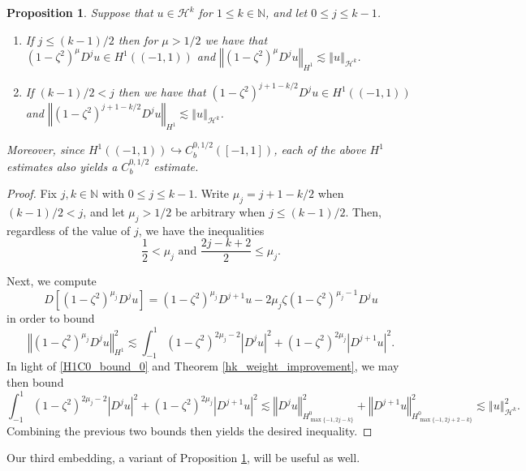\documentclass[11pt,reqno]{amsart}
\numberwithin{equation}{section}
\providecommand{\abs}[1]{\left\vert#1\right\vert}
\providecommand{\norm}[1]{\left\Vert#1\right\Vert}
\def\hal{\frac{1}{2}}
\def\ls{\lesssim}
\providecommand{\abs}[1]{\left\vert#1\right\vert}
\providecommand{\norm}[1]{\left\Vert#1\right\Vert}
\def\hal{\frac{1}{2}}
\def\ls{\lesssim}
\def\h{\mathcal{H}}
\def\N{\mathbb{N}}
\newtheorem{prop}[lem]{Proposition}
\begin{document}
\begin{prop}\label{H1C0_bound}
Suppose that $u \in \h^k$ for $1 \le k \in \N$, and let $0 \le j \le k-1$.
\begin{enumerate}
 \item If $j \le (k-1)/2$ then for $\mu >1/2$ we have that  $(1-\zeta^2)^\mu D^j u \in H^1((-1,1))$ and $\norm{(1-\zeta^2)^\mu D^j u }_{H^1} \ls \norm{u}_{\h^k}$.
 \item If $(k-1)/2 < j$ then we have that  $(1-\zeta^2)^{j+1-k/2} D^j u \in H^1((-1,1))$ and $\norm{(1-\zeta^2)^{j+1-k/2} D^j u }_{H^1} \ls \norm{u}_{\h^k}$. 
\end{enumerate}
Moreover, since $H^1((-1,1)) \hookrightarrow C^{0,1/2}_b([-1,1])$, each of the above $H^1$ estimates also yields a $C^{0,1/2}_b$ estimate.
\end{prop}
\begin{proof}
Fix $j,k \in \N$ with $0 \le j \le k-1$.  Write $\mu_j = j+1-k/2$ when $(k-1)/2 < j$, and let $\mu_j >1/2$ be arbitrary when $j \le (k-1)/2$.  Then, regardless of the value of $j$, we have the inequalities
\begin{equation}\label{H1C0_bound_0}
 \hal < \mu_j \text{ and } \frac{2j-k+2}{2} \le \mu_j.
\end{equation}

Next, we compute 
\begin{equation}
 D[(1-\zeta^2)^{\mu_j} D^j u] = (1-\zeta^2)^{\mu_j} D^{j+1}u  -2 \mu_j \zeta (1-\zeta^2)^{\mu_j-1}    D^j u
\end{equation}
in order to bound 
\begin{equation}
 \norm{(1-\zeta^2)^{\mu_j} D^j u}_{H^1}^2 \ls \int_{-1}^1 (1-\zeta^2)^{2\mu_j-2} \abs{D^j u}^2 +  (1-\zeta^2)^{2\mu_j} \abs{D^{j+1} u}^2.
\end{equation}
In light of \eqref{H1C0_bound_0} and Theorem \ref{hk_weight_improvement}, we may then bound 
\begin{equation}
\int_{-1}^1 (1-\zeta^2)^{2\mu_j-2} \abs{D^j u}^2 +  (1-\zeta^2)^{2\mu_j} \abs{D^{j+1} u}^2 \ls  \norm{D^j u}_{H^0_{\max\{-1,2j-k\}}}^2 +  \norm{D^{j+1} u}_{H^0_{\max\{-1,2j+2-k\}}}^2 \ls \norm{u}_{\h^k}^2.
\end{equation}
Combining the previous two bounds then yields the desired inequality.
\end{proof}

Our third embedding, a variant of Proposition \ref{H1C0_bound}, will be useful as well.
\end{document}
